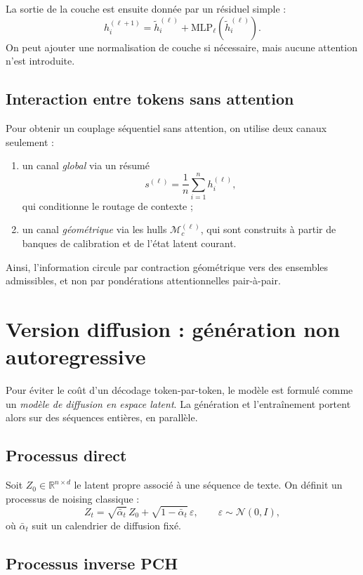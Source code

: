 \documentclass[11pt]{article}
\begin{document}
La sortie de la couche est ensuite donnée par un résiduel simple :
\[
h_i^{(\ell+1)}
=
\tilde h_i^{(\ell)}
+
\mathrm{MLP}_\ell\!\left(\tilde h_i^{(\ell)}\right).
\]
On peut ajouter une normalisation de couche si nécessaire, mais aucune attention n'est introduite.

\subsection{Interaction entre tokens sans attention}

Pour obtenir un couplage séquentiel sans attention, on utilise deux canaux seulement :

\begin{enumerate}[leftmargin=2em]
    \item un canal \emph{global} via un résumé
    \[
    s^{(\ell)}=\frac1n\sum_{i=1}^n h_i^{(\ell)},
    \]
    qui conditionne le routage de contexte ;
    \item un canal \emph{géométrique} via les hulls \(\mathcal M_c^{(\ell)}\), qui sont construits à partir de banques de calibration et de l'état latent courant.
\end{enumerate}

Ainsi, l'information circule par contraction géométrique vers des ensembles admissibles, et non par pondérations attentionnelles pair-à-pair.

\section{Version diffusion : génération non autoregressive}

Pour éviter le coût d'un décodage token-par-token, le modèle est formulé comme un \emph{modèle de diffusion en espace latent}. La génération et l'entraînement portent alors sur des séquences entières, en parallèle.

\subsection{Processus direct}

Soit \(Z_0 \in \mathbb R^{n\times d}\) le latent propre associé à une séquence de texte.
On définit un processus de noising classique :
\[
Z_t
=
\sqrt{\bar\alpha_t}\,Z_0
+
\sqrt{1-\bar\alpha_t}\,\varepsilon,
\qquad
\varepsilon\sim\mathcal N(0,I),
\]
où \(\bar\alpha_t\) suit un calendrier de diffusion fixé.

\subsection{Processus inverse PCH}
\end{document}
